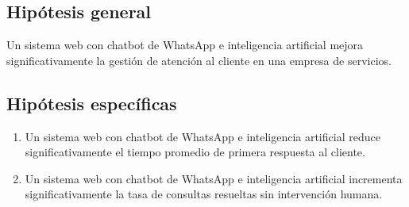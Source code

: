 \subsection{Hipótesis general}
Un sistema web con chatbot de WhatsApp e inteligencia artificial mejora significativamente la gestión de atención al cliente en una empresa de servicios.

\subsection{Hipótesis específicas}
\begin{enumerate}[label=\textbf{HE\arabic*:},leftmargin=1.27cm,itemsep=4pt]
\item Un sistema web con chatbot de WhatsApp e inteligencia artificial reduce significativamente el tiempo promedio de primera respuesta al cliente.
\item Un sistema web con chatbot de WhatsApp e inteligencia artificial incrementa significativamente la tasa de consultas resueltas sin intervención humana.
\end{enumerate}
